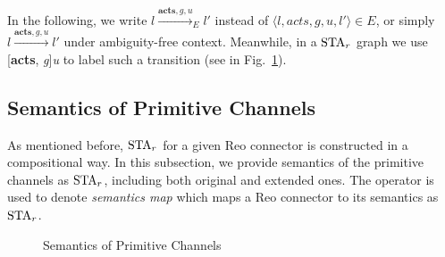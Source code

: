 In the following, we write $l \xrightarrow{\textbf{acts}, g, u}_E l'$ instead of $\langle l, acts, g , u, l' \rangle \in E$, or simply $l \xrightarrow{\textbf{acts}, g, u} l'$ under ambiguity-free context. Meanwhile, in a $\mbox{STA}_r$ graph we use [\textbf{acts}, \emph{g}]\emph{u} to label such a transition (see in Fig.~\ref{fig:basic}).

\subsection{Semantics of Primitive Channels}
As mentioned before, $\mbox{STA}_r$ for a given Reo connector is constructed in a compositional way. In this subsection, we provide semantics of the primitive channels as $\mbox{STA}_r$, including both original and extended ones. The \sem{\cdot} operator is used to denote \emph{semantics map} which maps a Reo connector to its semantics as $\mbox{STA}_r$.

\begin{figure}[H]
    \centering
    \resizebox{\textwidth}{!}{
        
    }
    \caption{Semantics of Primitive Channels}
    \label{fig:basic}
\end{figure}


